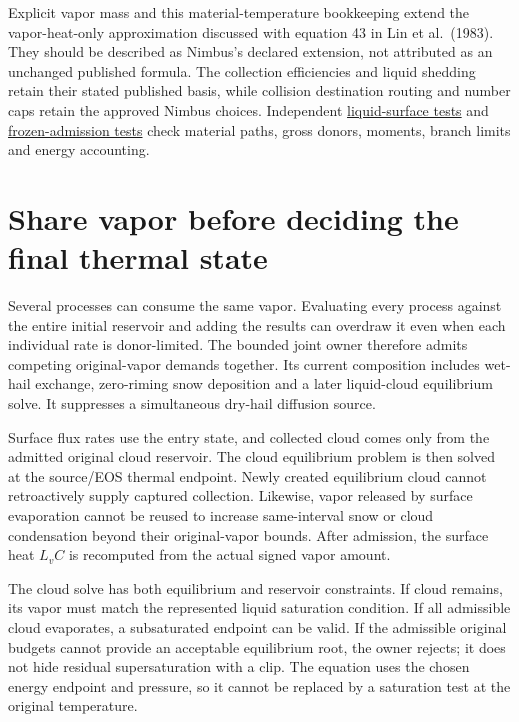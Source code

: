 \documentclass[
  11pt,
]{report}
\begin{document}
Explicit vapor mass and this material-temperature bookkeeping extend the
vapor-heat-only approximation discussed with equation 43 in Lin et
al.~(1983). They should be described as Nimbus's declared extension, not
attributed as an unchanged published formula. The collection
efficiencies and liquid shedding retain their stated published basis,
while collision destination routing and number caps retain the approved
Nimbus choices. Independent
\href{../tests/physics/test_milbrandt_triple_hail_surface_liquid.cpp}{liquid-surface
tests} and
\href{../tests/physics/test_milbrandt_triple_hail_surface_frozen.cpp}{frozen-admission
tests} check material paths, gross donors, moments, branch limits and
energy accounting.

\section{Share vapor before deciding the final thermal
state}\label{share-vapor-before-deciding-the-final-thermal-state}

Several processes can consume the same vapor. Evaluating every process
against the entire initial reservoir and adding the results can overdraw
it even when each individual rate is donor-limited. The bounded joint
owner therefore admits competing original-vapor demands together. Its
current composition includes wet-hail exchange, zero-riming snow
deposition and a later liquid-cloud equilibrium solve. It suppresses a
simultaneous dry-hail diffusion source.

Surface flux rates use the entry state, and collected cloud comes only
from the admitted original cloud reservoir. The cloud equilibrium
problem is then solved at the source/EOS thermal endpoint. Newly created
equilibrium cloud cannot retroactively supply captured collection.
Likewise, vapor released by surface evaporation cannot be reused to
increase same-interval snow or cloud condensation beyond their
original-vapor bounds. After admission, the surface heat \(L_vC\) is
recomputed from the actual signed vapor amount.

The cloud solve has both equilibrium and reservoir constraints. If cloud
remains, its vapor must match the represented liquid saturation
condition. If all admissible cloud evaporates, a subsaturated endpoint
can be valid. If the admissible original budgets cannot provide an
acceptable equilibrium root, the owner rejects; it does not hide
residual supersaturation with a clip. The equation uses the chosen
energy endpoint and pressure, so it cannot be replaced by a saturation
test at the original temperature.
\end{document}

